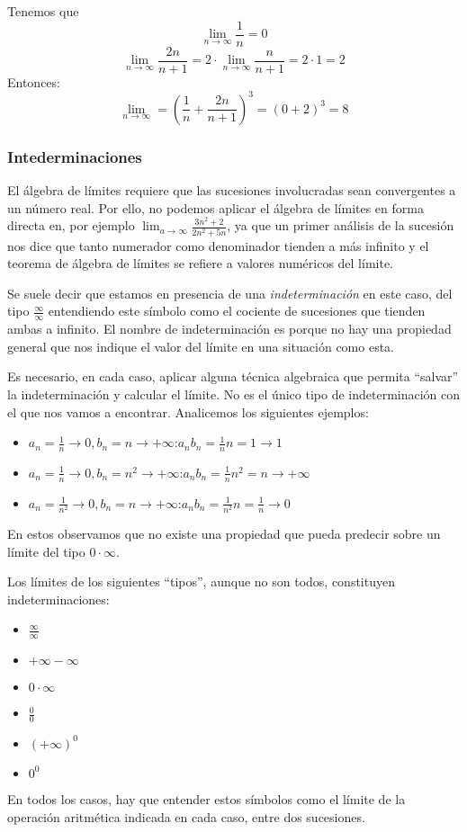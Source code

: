 \documentclass[../Teoría.root.tex]{subfiles}
\begin{document}
Tenemos que \[\lim_{n\to\infty}\frac{1}{n}=0\] \[\lim_{n\to\infty}\frac{2n}{n+1}=2\cdot\lim_{n\to\infty}\frac{n}{n+1}=2\cdot1=2\]
Entonces:
\[\lim_{n\to\infty}=\left(\frac{1}{n}+\frac{2n}{n+1}\right)^3=(0+2)^3=8\]
\subsubsection{Intederminaciones}
El álgebra de límites requiere que las sucesiones involucradas sean convergentes a un número real.
Por ello, no podemos aplicar el álgebra de límites en forma directa en, por ejemplo \(\lim_{a\to\infty}\frac{3n^2+2}{2n^2+5n}\), ya que un primer análisis de la sucesión nos dice que tanto numerador como denominador tienden a más infinito y el teorema de álgebra de límites se refiere a valores numéricos del límite.

Se suele decir que estamos en presencia de una \textit{indeterminación} en este caso, del tipo \(\frac{\infty}{\infty}\) entendiendo este símbolo como el cociente de sucesiones que tienden ambas a infinito.
El nombre de indeterminación es porque no hay una propiedad general que nos indique el valor del límite en una situación como esta.

Es necesario, en cada caso, aplicar alguna técnica algebraica que permita “salvar” la indeterminación y calcular el límite.
No es el único tipo de indeterminación con el que nos vamos a encontrar.
Analicemos los siguientes ejemplos:
\begin{itemize}
    \item \(a_n=\frac{1}{n}\rightarrow0,b_n=n\rightarrow+\infty\):\tab\(a_nb_n=\frac{1}{n}n=1\rightarrow1\)
    \item \(a_n=\frac{1}{n}\rightarrow0,b_n=n^2\rightarrow+\infty\):\tab\(a_nb_n=\frac{1}{n}n^2=n\rightarrow+\infty\)
    \item \(a_n=\frac{1}{n^2}\rightarrow0,b_n=n\rightarrow+\infty\):\tab\(a_nb_n=\frac{1}{n^2}n=\frac{1}{n}\rightarrow0\)
\end{itemize}
En estos observamos que no existe una propiedad que pueda predecir sobre un límite del tipo \(0\cdot\infty\).

Los límites de los siguientes “tipos”, aunque no son todos, constituyen indeterminaciones:
\begin{itemize}
    \item \(\frac{\infty}{\infty}\)
    \item \(+\infty-\infty\)
    \item \(0\cdot\infty\)
    \item \(\frac{0}{0}\)
    \item \((+\infty)^0\)
    \item \(0^0\)
\end{itemize}
En todos los casos, hay que entender estos símbolos como el límite de la operación aritmética indicada en cada caso, entre dos sucesiones.
\end{document}
